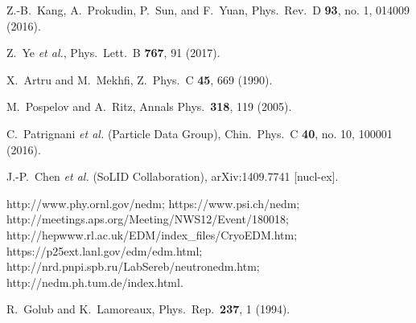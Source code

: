 \documentclass[aps,prd,twocolumn,groupedaddress,showpacs,superscriptaddress,floatfix,nofootinbib,10pt]{revtex4-1}
\begin{document}
\begin{thebibliography}{}
  Z.-B.~Kang, A.~Prokudin, P.~Sun, and F.~Yuan,
  Phys.\ Rev.\ D {\bf 93}, no. 1, 014009 (2016).


  Z.~Ye {\it et al.},
  Phys.\ Lett.\ B {\bf 767}, 91 (2017).


  X.~Artru and M.~Mekhfi,
  Z.\ Phys.\ C {\bf 45}, 669 (1990).


  M.~Pospelov and A.~Ritz,
  Annals Phys.\  {\bf 318}, 119 (2005).


  C.~Patrignani {\it et al.} (Particle Data Group),
  Chin.\ Phys.\ C {\bf 40}, no. 10, 100001 (2016).


  J.-P.~Chen {\it et al.} (SoLID Collaboration),
  arXiv:1409.7741 [nucl-ex].


http://www.phy.ornl.gov/nedm;
https://www.psi.ch/nedm;   http://meetings.aps.org/Meeting/NWS12/Event/180018; http://hepwww.rl.ac.uk/EDM/index\_files/CryoEDM.htm; https://p25ext.lanl.gov/edm/edm.html; http://nrd.pnpi.spb.ru/LabSereb/neutronedm.htm; http://nedm.ph.tum.de/index.html.

  R.~Golub and K.~Lamoreaux,
  Phys.\ Rep.\  {\bf 237}, 1 (1994).
  

\end{thebibliography}
\end{document}
